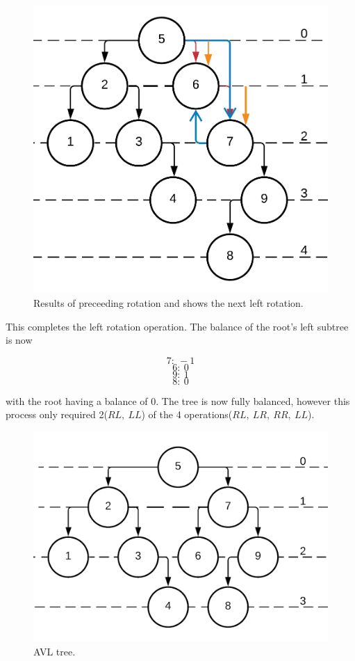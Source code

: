 \documentclass[journal]{IEEEtran}
\begin{document}
\begin{figure}[h!]
	\includegraphics[scale = 0.2]{avl13.png}
	\caption{Results of preceeding rotation and shows the next left rotation.}
\end{figure}

This completes the left rotation 
operation. The balance of the root's left subtree is now 

$$7:~-1$$
$$6:~0$$
$$9:~1$$
$$8:~0$$

with the root having a balance of $0$. The tree is now fully balanced, however this process only required 2($RL,~LL$)
of the 4 operations($RL,~LR,~RR,~LL$).

\begin{figure}[h!]
	\includegraphics[scale = 0.2]{avl14.png}
	\caption{AVL tree.}
\end{figure}
\end{document}
